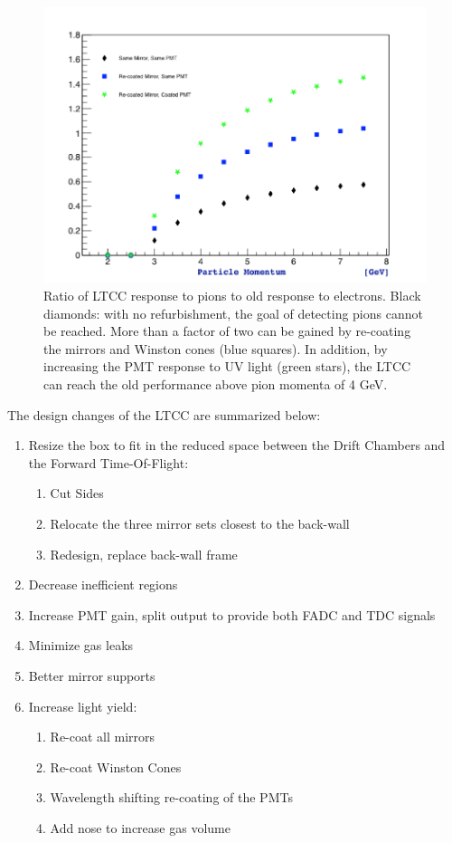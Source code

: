 \begin{figure}
	\centering
	\includegraphics[width=0.95\columnwidth,keepaspectratio]{img/refurbishmentGains.png}
	\caption{Ratio of LTCC response to pions to old response to electrons. Black diamonds: with no refurbishment, the goal of detecting pions cannot be reached.
            More than a factor of two can be gained by re-coating the mirrors and Winston cones (blue squares). In addition, by increasing the
            PMT response to UV light (green stars), the LTCC can reach the old performance above pion momenta of 4 GeV.}
	\label{fig:refurbishmentGains}
\end{figure}

The design changes of the LTCC are summarized below:

\begin{enumerate}
\item Resize the box to fit in the reduced space between the Drift Chambers and the Forward Time-Of-Flight:
	\begin{enumerate}
		\item Cut Sides
		\item Relocate the three mirror sets closest to the back-wall
		\item Redesign, replace back-wall frame
	\end{enumerate}

	\item Decrease inefficient regions
	\item Increase PMT gain, split output to provide both FADC and TDC signals
	\item Minimize gas leaks
	\item Better mirror supports
	\item Increase light yield:
	\begin{enumerate}
		\item Re-coat all mirrors
		\item Re-coat Winston Cones
		\item Wavelength shifting re-coating of the PMTs
		\item Add nose to increase gas volume
	\end{enumerate}
\end{enumerate}








